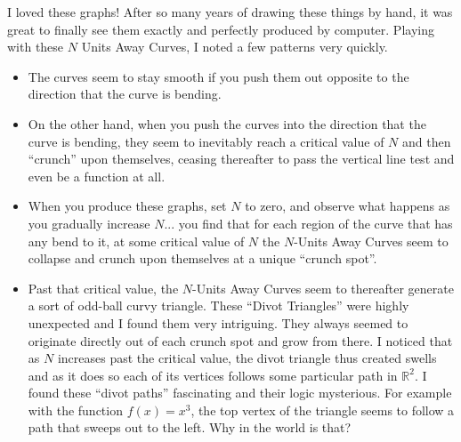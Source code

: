 I loved these graphs! After so many years of drawing these things by hand, it was great to finally see them exactly and perfectly produced by computer. Playing with these $N$ Units Away Curves, I noted a few patterns very quickly.

\begin{itemize}
    \item The curves seem to stay smooth if you push them out opposite to the direction that the curve is bending.
    \item On the other hand, when you push the curves into the direction that the curve is bending, they seem to inevitably reach a critical value of $N$ and then ``crunch'' upon themselves, ceasing thereafter to pass the vertical line test and even be a function at all.
    \item When you produce these graphs, set $N$ to zero, and observe what happens as you gradually increase $N$... you find that for each region of the curve that has any bend to it, at some critical value of $N$ the $N$-Units Away Curves seem to collapse and crunch upon themselves at a unique ``crunch spot''. 
    \item Past that critical value, the $N$-Units Away Curves seem to thereafter generate a sort of odd-ball curvy triangle. These ``Divot Triangles'' were highly unexpected and I found them very intriguing. They always seemed to originate directly out of each crunch spot and grow from there. I noticed that as $N$ increases past the critical value, the divot triangle thus created swells and as it does so each of its vertices follows some particular path in $\mathbb{R}^2$. I found these ``divot paths'' fascinating and their logic mysterious. For example with the function $f(x) = x^3$, the top vertex of the triangle seems to follow a path that sweeps out to the left. Why in the world is that?
\end{itemize}

